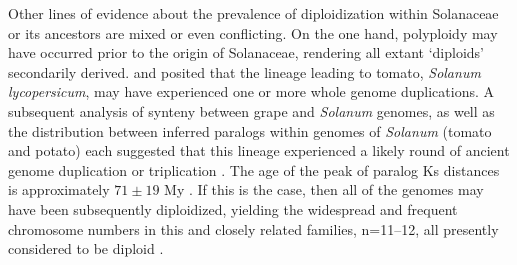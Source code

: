 Other lines of evidence about the prevalence of diploidization within Solanaceae or its ancestors are mixed or even conflicting.
On the one hand, polyploidy may have occurred prior to the origin of Solanaceae, rendering all extant `diploids' secondarily derived.
 and \citet{blanc2004} posited that the lineage leading to tomato, \emph{Solanum lycopersicum}, may have experienced one or more whole genome duplications.
A subsequent analysis of synteny between grape and \emph{Solanum} genomes, as well as the distribution between inferred paralogs within genomes of \emph{Solanum} (tomato and potato) each suggested that this lineage experienced a likely round of ancient genome duplication or triplication \citep{tomato2012}. 
The age of the peak of paralog Ks distances is approximately $71 \pm 19$ My \citep{tomato2012}. 
If this is the case, then all of the genomes may have been subsequently diploidized, yielding the widespread and frequent chromosome numbers in this and closely related families, n=11--12, all presently considered to be diploid \citep{robertson_2011}. 

